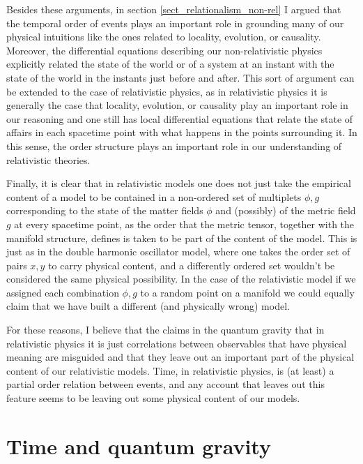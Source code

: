 \documentclass[12 pt]{article}
\begin{document}
Besides these arguments, in section \ref{sect_relationalism_non-rel} I argued that the temporal order of events plays an important role in grounding many of our physical intuitions like the ones related to locality, evolution, or causality. Moreover, the differential equations describing our non-relativistic physics explicitly related the state of the world or of a system at an instant with the state of the world in the instants just before and after. This sort of argument can be extended to the case of relativistic physics, as in relativistic physics it is generally the case that locality, evolution, or causality play an important role in our reasoning and one still has local differential equations that relate the state of affairs in each spacetime point with what happens in the points surrounding it. In this sense, the order structure plays an important role in our understanding of relativistic theories.

Finally, it is clear that in relativistic models one does not just take the empirical content of a model to be contained in a non-ordered set of multiplets $\phi,g$ corresponding to the state of the matter fields $\phi$ and (possibly) of the metric field $g$ at every spacetime point, as the order that the metric tensor, together with the manifold structure, defines is taken to be part of the content of the model. This is just as in the double harmonic oscillator model, where one takes the order set of pairs $x,y$ to carry physical content, and a differently ordered set wouldn't be considered the same physical possibility. In the case of the relativistic model if we assigned each combination $\phi,g$ to a random point on a manifold we could equally claim that we have built a different (and physically wrong) model.

For these reasons, I believe that the claims in the quantum gravity that in relativistic physics it is just correlations between observables that have physical meaning are misguided and that they leave out an important part of the physical content of our relativistic models. Time, in relativistic physics, is (at least) a partial order relation between events, and any account that leaves out this feature seems to be leaving out some physical content of our models.   

\section{Time and quantum gravity} \label{sect_quantum_gravity}
\end{document}

